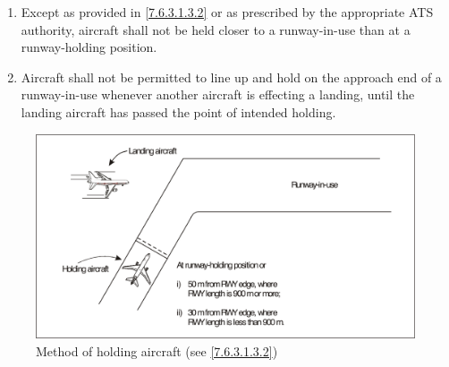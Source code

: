 \begin{enumeratesc}
\begin{enumerate}[labelindent=0pt,itemsep=0.2cm]
        \begin{enumerate}
            \item Except as provided in \ref{7.6.3.1.3.2} or as prescribed by the appropriate ATS authority, aircraft shall not be held closer to a runway-in-use than at a runway-holding position.
            \item \label{7.6.3.1.3.2} Aircraft shall not be permitted to line up and hold on the approach end of a runway-in-use whenever another aircraft is effecting a landing, until the landing aircraft has passed the point of intended holding.
        \end{enumerate}

        \vspace{0.5cm}
        \begin{figure}[!ht]
            \centering
            \includegraphics[width=14cm,keepaspectratio]{Images/Fig 7-2.png}
            \caption[Method of holding aircraft]{Method of holding aircraft (see \ref{7.6.3.1.3.2})}
            \label{fig:7-2}
        \end{figure}


\end{enumerate}
\end{enumeratesc}
